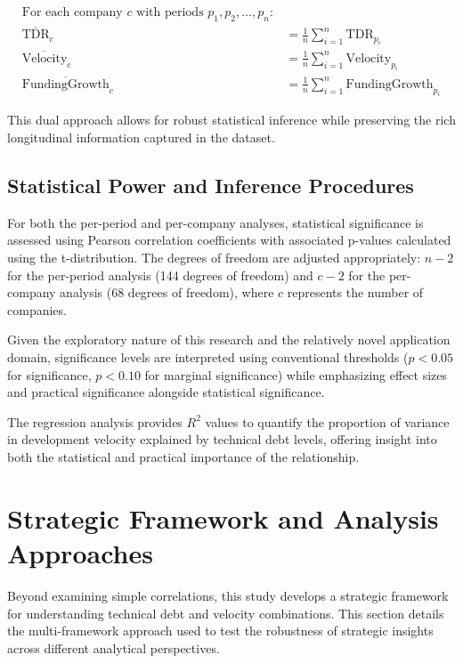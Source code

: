 \vspace{-0.8cm}

\begin{align}
\text{For each company } c \text{ with periods } p_1, p_2, \ldots, p_n: \nonumber \\
\overline{\text{TDR}}_c &= \frac{1}{n} \sum_{i=1}^{n} \text{TDR}_{p_i} \\
\overline{\text{Velocity}}_c &= \frac{1}{n} \sum_{i=1}^{n} \text{Velocity}_{p_i} \\
\overline{\text{FundingGrowth}}_c &= \frac{1}{n} \sum_{i=1}^{n} \text{FundingGrowth}_{p_i}
\end{align}

This dual approach allows for robust statistical inference while preserving the rich longitudinal information captured in the dataset.

\subsection{Statistical Power and Inference Procedures}

For both the per-period and per-company analyses, statistical significance is assessed using Pearson correlation coefficients with associated p-values calculated using the t-distribution. The degrees of freedom are adjusted appropriately: $n-2$ for the per-period analysis (144 degrees of freedom) and $c-2$ for the per-company analysis (68 degrees of freedom), where $c$ represents the number of companies.

Given the exploratory nature of this research and the relatively novel application domain, significance levels are interpreted using conventional thresholds ($p < 0.05$ for significance, $p < 0.10$ for marginal significance) while emphasizing effect sizes and practical significance alongside statistical significance.

The regression analysis provides $R^2$ values to quantify the proportion of variance in development velocity explained by technical debt levels, offering insight into both the statistical and practical importance of the relationship.

\section{Strategic Framework and Analysis Approaches}\label{sec:strategic_framework}

Beyond examining simple correlations, this study develops a strategic framework for understanding technical debt and velocity combinations. This section details the multi-framework approach used to test the robustness of strategic insights across different analytical perspectives.

